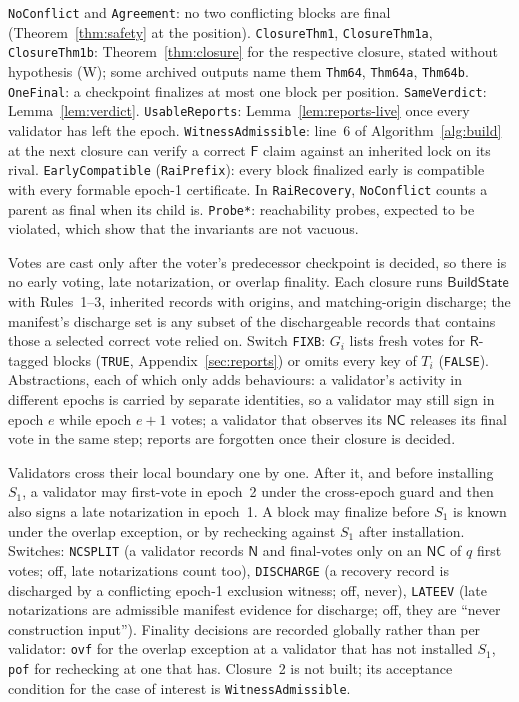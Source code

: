 \documentclass[conference]{IEEEtran}
\newcommand{\NC}{\mathsf{NC}}
\newcommand{\Build}{\mathsf{BuildState}}
\newcommand{\tagR}{\mathsf{R}}
\newcommand{\tagN}{\mathsf{N}}
\newcommand{\tagF}{\mathsf{F}}
\begin{document}
\texttt{NoConflict} and \texttt{Agreement}: no two conflicting blocks are final (Theorem~\ref{thm:safety} at the position). \texttt{ClosureThm1}, \texttt{ClosureThm1a}, \texttt{ClosureThm1b}: Theorem~\ref{thm:closure} for the respective closure, stated without hypothesis (W); some archived outputs name them \texttt{Thm64}, \texttt{Thm64a}, \texttt{Thm64b}. \texttt{OneFinal}: a checkpoint finalizes at most one block per position. \texttt{SameVerdict}: Lemma~\ref{lem:verdict}. \texttt{UsableReports}: Lemma~\ref{lem:reports-live} once every validator has left the epoch. \texttt{WitnessAdmissible}: line~6 of Algorithm~\ref{alg:build} at the next closure can verify a correct $\tagF$ claim against an inherited lock on its rival. \texttt{EarlyCompatible} (\texttt{RaiPrefix}): every block finalized early is compatible with every formable epoch-1 certificate. In \texttt{RaiRecovery}, \texttt{NoConflict} counts a parent as final when its child is. \texttt{Probe*}: reachability probes, expected to be violated, which show that the invariants are not vacuous.

Votes are cast only after the voter's predecessor checkpoint is decided, so there is no early voting, late notarization, or overlap finality. Each closure runs $\Build$ with Rules~1--3, inherited records with origins, and matching-origin discharge; the manifest's discharge set is any subset of the dischargeable records that contains those a selected correct vote relied on. Switch \texttt{FIXB}: $G_i$ lists fresh votes for $\tagR$-tagged blocks (\texttt{TRUE}, Appendix~\ref{sec:reports}) or omits every key of $T_i$ (\texttt{FALSE}). Abstractions, each of which only adds behaviours: a validator's activity in different epochs is carried by separate identities, so a validator may still sign in epoch $e$ while epoch $e+1$ votes; a validator that observes its $\NC$ releases its final vote in the same step; reports are forgotten once their closure is decided.

Validators cross their local boundary one by one. After it, and before installing $S_1$, a validator may first-vote in epoch~2 under the cross-epoch guard and then also signs a late notarization in epoch~1. A block may finalize before $S_1$ is known under the overlap exception, or by rechecking against $S_1$ after installation. Switches: \texttt{NCSPLIT} (a validator records $\tagN$ and final-votes only on an $\NC$ of $q$ first votes; off, late notarizations count too), \texttt{DISCHARGE} (a recovery record is discharged by a conflicting epoch-1 exclusion witness; off, never), \texttt{LATEEV} (late notarizations are admissible manifest evidence for discharge; off, they are ``never construction input''). Finality decisions are recorded globally rather than per validator: \texttt{ovf} for the overlap exception at a validator that has not installed $S_1$, \texttt{pof} for rechecking at one that has. Closure~2 is not built; its acceptance condition for the case of interest is \texttt{WitnessAdmissible}.
\end{document}
